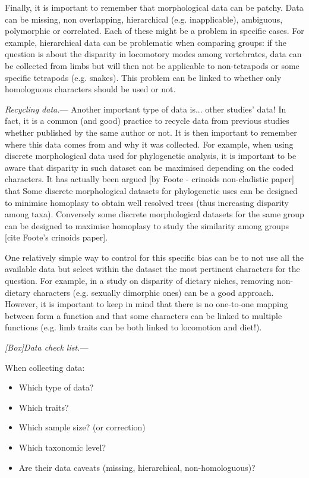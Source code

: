 \documentclass[12pt,letterpaper]{article}
\renewcommand{\subsubsection}[1]{%
\vspace{2ex}
\noindent
\textit{#1.}---}
\begin{document}
Finally, it is important to remember that morphological data can be patchy.
Data can be missing, non overlapping, hierarchical (e.g. inapplicable), ambiguous, polymorphic or correlated.
Each of these might be a problem in specific cases.
For example, hierarchical data can be problematic when comparing groups: if the question is about the disparity in locomotory modes among vertebrates, data can be collected from limbs but will then not be applicable to non-tetrapods or some specific tetrapods (e.g. snakes).
This problem can be linked to whether only homologuous characters should be used or not.

\subsubsection{Recycling data}
Another important type of data is... other studies' data!
In fact, it is a common (and good) practice to recycle data from previous studies whether published by the same author or not.
It is then important to remember where this data comes from and why it was collected.
For example, when using discrete morphological data used for phylogenetic analysis, it is important to be aware that disparity in such dataset can be maximised depending on the coded characters.
It has actually been argued [by Foote - crinoids non-cladistic paper] that 
Some discrete morphological datasets for phylogenetic uses can be designed to minimise homoplasy to obtain well resolved trees (thus increasing disparity among taxa).
Conversely some discrete morphological datasets for the same group can be designed to maximise homoplasy to study the similarity among groups [cite Foote's crinoids paper].

One relatively simple way to control for this specific bias can be to not use all the available data but select within the dataset the most pertinent characters for the question.
For example, in a study on disparity of dietary niches, removing non-dietary characters (e.g. sexually dimorphic ones) can be a good approach.
However, it is important to keep in mind that there is no one-to-one mapping between form a function and that some characters can be linked to multiple functions (e.g. limb traits can be both linked to locomotion and diet!).

\subsubsection{[Box]Data check list}

When collecting data:
\begin{itemize}
    \item Which type of data?
    \item Which traits?
    \item Which sample size? (or correction)
    \item Which taxonomic level?
    \item Are their data caveats (missing, hierarchical, non-homologuous)?
\end{itemize}
\end{document}
